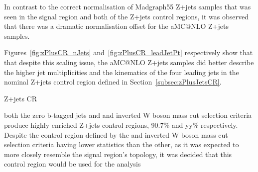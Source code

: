 In contrast to the correct normalisation of Madgraph55 Z+jets samples that was seen in the signal region and both of the Z+jets control regions, it was observed that there was a dramatic normalisation offset for the aMC@NLO Z+jets samples.

Figures~\ref{fig:zPlusCR_nJets} and~\ref{fig:zPlusCR_leadJetPt} respectively show that that despite this scaling issue, the aMC@NLO Z+jets samples did better describe the higher jet multiplicities and the kinematics of the four leading jets in the nominal Z+jets control region defined in Section~\ref{subsec:zPlusJetsCR}.

Z+jets CR

both the zero b-tagged jets and \MET and inverted W boson mass cut selection criteria produce highly enriched Z+jets control regions, 90.7\% and yy\% respectively.
Despite the control region defined by the \MET and inverted W boson mass cut selection criteria having lower statistics than the other, as it was expected to more closely resemble the signal region's topology, it was decided that this control region would be used for the analysis

